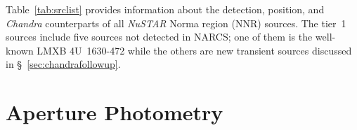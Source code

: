 \documentclass[iop,revtex4]{emulateapj}
\begin{document}
Table~\ref{tab:srclist} provides information about the detection, position, and \textit{Chandra} counterparts of all \textit{NuSTAR} Norma region (NNR) sources.  The tier~1 sources include five sources not detected in NARCS; one of them is the well-known LMXB 4U~1630-472 \citep{kuulkers97} while the others are new transient sources discussed in \S~\ref{sec:chandrafollowup}. 

\section{Aperture Photometry}
\label{sec:phot}
\end{document}
